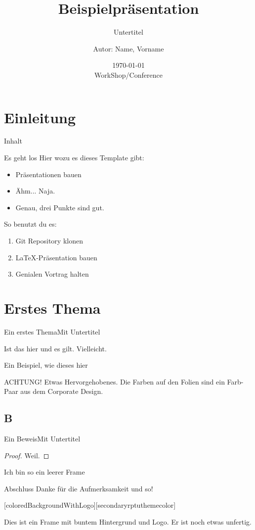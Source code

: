 \documentclass[german,10pt,xcolor=colortbl,compress,aspectratio=169
]{beamer}
\title{Beispielpräsentation}
\subtitle{Untertitel}
\date[]{\today\\[1ex] WorkShop/Conference}
\author[Autor in Fußzeile]{Autor: Name, Vorname}
\institute[]{AG xy\\FB ab\\RPTU in Kaiserslautern}
\begin{document}
\maketitle
\section{Einleitung}
\begin{frame}{Inhalt}
	\tableofcontents
\end{frame}
\begin{frame}{Es geht los}
	Hier wozu es dieses Template gibt:
	\begin{itemize}
		\item Präsentationen bauen
		\item Ähm... Naja.
		\item Genau, drei Punkte sind gut.
	\end{itemize}
	So benutzt du es:
	\begin{enumerate}
		\item Git Repository klonen
		\item \LaTeX-Präsentation bauen
		\item Genialen Vortrag halten
	\end{enumerate}
\end{frame}
\section{Erstes Thema}
\begin{frame}{Ein erstes Thema}{Mit Untertitel}
	\begin{lemma}
		Ist das hier und es gilt. Vielleicht.
	\end{lemma}
	\begin{example}
		Ein Beispiel, wie dieses hier
	\end{example}
	\alert{ACHTUNG!}
	Etwas Hervorgehobenes. Die Farben auf den Folien sind ein Farb-Paar aus dem Corporate Design.\\

\end{frame}
\subsection{B}
\begin{frame}{Ein Beweis}{Mit Untertitel}
	\begin{proof}
		Weil.
	\end{proof}
\end{frame}
\begin{frame}[plain]{}{}%
	Ich bin so ein leerer Frame
\end{frame}
\begin{frame}{Abschluss}
	Danke für die Aufmerksamkeit und so!
\end{frame}

[coloredBackgroundWithLogo][secondaryrptuthemecolor]
\begin{frame}[plain]
	Dies ist ein Frame mit buntem Hintergrund und Logo. Er ist noch etwas unfertig.
\end{frame}
\end{document}
